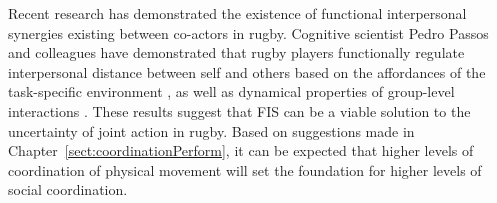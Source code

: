 \begin{CJK}{UTF8}{gbsn}
Recent research has demonstrated the existence of functional interpersonal synergies existing between co-actors in rugby.
Cognitive scientist Pedro Passos and colleagues have demonstrated that rugby players functionally regulate interpersonal distance between self and others based on the affordances of the task-specific environment \citep[e.g., the location of other athletes, and the space available on the field, see:][]{Passos2011}, as well as dynamical properties of group-level interactions \citep{Passos2014}.  These results suggest that FIS can be a viable solution to the uncertainty of joint action in rugby.  Based on suggestions made in Chapter~\ref{sect:coordinationPerform}, it can be expected that higher levels of coordination of physical movement will set the foundation for higher levels of social coordination.




\end{CJK}
